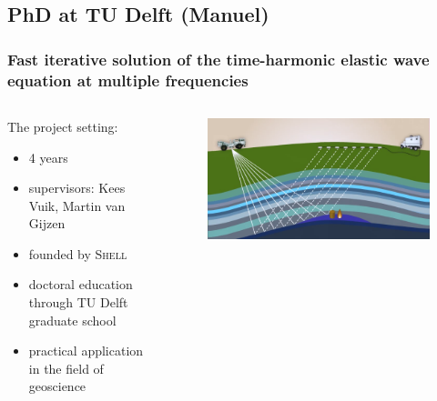 \documentclass{beamer}
\begin{document}
\subsection{PhD at TU Delft (Manuel)}
\begin{frame}
\frametitle{Fast iterative solution of the time-harmonic elastic wave equation at multiple frequencies}
\begin{columns}
\begin{column}{0.6\textwidth}
 The project setting:
 \begin{itemize}
  \item 4 years
  \item supervisors: Kees Vuik, Martin van Gijzen
  \item founded by \textsc{Shell}
  \item doctoral education through TU Delft graduate school
  \item practical application in the field of geoscience
 \end{itemize}
\end{column}
\begin{column}{0.4\textwidth}
\begin{figure}[t]
\centering
\vspace{-1.3cm}
\includegraphics[width=\textwidth]{images/snapshot1.png}
\end{figure}
\end{column}
\end{columns}

\end{frame}
\end{document}

